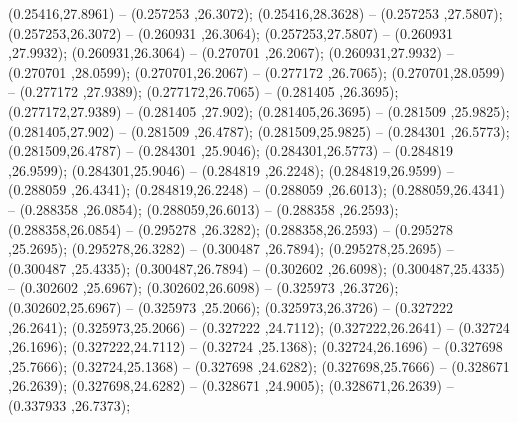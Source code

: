  (0.25416,27.8961) -- (0.257253 ,26.3072);
 (0.25416,28.3628) -- (0.257253 ,27.5807);
 (0.257253,26.3072) -- (0.260931 ,26.3064);
 (0.257253,27.5807) -- (0.260931 ,27.9932);
 (0.260931,26.3064) -- (0.270701 ,26.2067);
 (0.260931,27.9932) -- (0.270701 ,28.0599);
 (0.270701,26.2067) -- (0.277172 ,26.7065);
 (0.270701,28.0599) -- (0.277172 ,27.9389);
 (0.277172,26.7065) -- (0.281405 ,26.3695);
 (0.277172,27.9389) -- (0.281405 ,27.902);
 (0.281405,26.3695) -- (0.281509 ,25.9825);
 (0.281405,27.902) -- (0.281509 ,26.4787);
 (0.281509,25.9825) -- (0.284301 ,26.5773);
 (0.281509,26.4787) -- (0.284301 ,25.9046);
 (0.284301,26.5773) -- (0.284819 ,26.9599);
 (0.284301,25.9046) -- (0.284819 ,26.2248);
 (0.284819,26.9599) -- (0.288059 ,26.4341);
 (0.284819,26.2248) -- (0.288059 ,26.6013);
 (0.288059,26.4341) -- (0.288358 ,26.0854);
 (0.288059,26.6013) -- (0.288358 ,26.2593);
 (0.288358,26.0854) -- (0.295278 ,26.3282);
 (0.288358,26.2593) -- (0.295278 ,25.2695);
 (0.295278,26.3282) -- (0.300487 ,26.7894);
 (0.295278,25.2695) -- (0.300487 ,25.4335);
 (0.300487,26.7894) -- (0.302602 ,26.6098);
 (0.300487,25.4335) -- (0.302602 ,25.6967);
 (0.302602,26.6098) -- (0.325973 ,26.3726);
 (0.302602,25.6967) -- (0.325973 ,25.2066);
 (0.325973,26.3726) -- (0.327222 ,26.2641);
 (0.325973,25.2066) -- (0.327222 ,24.7112);
 (0.327222,26.2641) -- (0.32724 ,26.1696);
 (0.327222,24.7112) -- (0.32724 ,25.1368);
 (0.32724,26.1696) -- (0.327698 ,25.7666);
 (0.32724,25.1368) -- (0.327698 ,24.6282);
 (0.327698,25.7666) -- (0.328671 ,26.2639);
 (0.327698,24.6282) -- (0.328671 ,24.9005);
 (0.328671,26.2639) -- (0.337933 ,26.7373);
